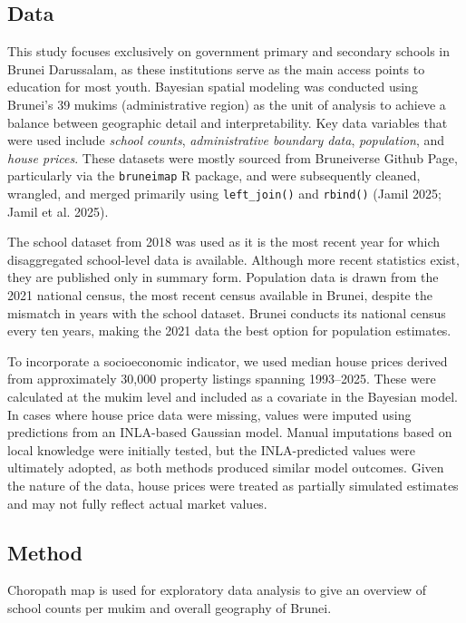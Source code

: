 \documentclass[
  12pt,
]{article}
\begin{document}
\subsection{Data}\label{data}

This study focuses exclusively on government primary and secondary
schools in Brunei Darussalam, as these institutions serve as the main
access points to education for most youth. Bayesian spatial modeling was
conducted using Brunei's 39 mukims (administrative region) as the unit
of analysis to achieve a balance between geographic detail and
interpretability. Key data variables that were used include \emph{school
counts}, \emph{administrative boundary data}, \emph{population}, and
\emph{house prices}. These datasets were mostly sourced from Bruneiverse
Github Page, particularly via the \texttt{bruneimap} R package, and were
subsequently cleaned, wrangled, and merged primarily using
\texttt{left\_join()} and \texttt{rbind()} (Jamil 2025; Jamil et al.
2025).

The school dataset from 2018 was used as it is the most recent year for
which disaggregated school-level data is available. Although more recent
statistics exist, they are published only in summary form. Population
data is drawn from the 2021 national census, the most recent census
available in Brunei, despite the mismatch in years with the school
dataset. Brunei conducts its national census every ten years, making the
2021 data the best option for population estimates.

To incorporate a socioeconomic indicator, we used median house prices
derived from approximately 30,000 property listings spanning 1993--2025.
These were calculated at the mukim level and included as a covariate in
the Bayesian model. In cases where house price data were missing, values
were imputed using predictions from an INLA-based Gaussian model. Manual
imputations based on local knowledge were initially tested, but the
INLA-predicted values were ultimately adopted, as both methods produced
similar model outcomes. Given the nature of the data, house prices were
treated as partially simulated estimates and may not fully reflect
actual market values.

\subsection{Method}\label{sec-method}

Choropath map is used for exploratory data analysis to give an overview
of school counts per mukim and overall geography of Brunei.
\end{document}

